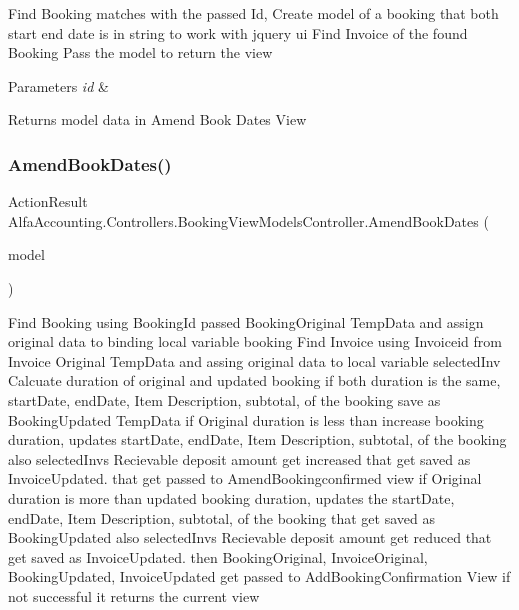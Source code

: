 Find Booking matches with the passed Id, Create model of a booking that both start end date is in string to work with jquery ui Find Invoice of the found Booking Pass the model to return the view 


\begin{DoxyParams}{Parameters}
{\em id} & \\
\hline
\end{DoxyParams}
\begin{DoxyReturn}{Returns}
model data in Amend Book Dates View
\end{DoxyReturn}
\mbox{\label{class_alfa_accounting_1_1_controllers_1_1_booking_view_models_controller_ac7f71cbbf29ebdd1103368248f4f70f8}} 
\subsubsection{\texorpdfstring{Amend\+Book\+Dates()}{AmendBookDates()}\hspace{0.1cm}{\footnotesize\ttfamily [2/2]}}
{\footnotesize\ttfamily Action\+Result Alfa\+Accounting.\+Controllers.\+Booking\+View\+Models\+Controller.\+Amend\+Book\+Dates (\begin{DoxyParamCaption}\item[{\mbox{[}\+Bind(\+Include = \char`\"{}\+Booking\+Id,\+Booked\+Date,\+Booking\+Start\+Date\+Time,\+Booking\+End\+Date\+Time,\+Unit\+Price\+Id,\+Id,\+Invoice\+Id\char`\"{})\mbox{]} Amend\+Book\+Dates\+Date\+Filter\+Model}]{model }\end{DoxyParamCaption})}



Find Booking using Booking\+Id passed Booking\+Original Temp\+Data and assign original data to binding local variable booking Find Invoice using Invoiceid from Invoice Original Temp\+Data and assing original data to local variable selected\+Inv Calcuate duration of original and updated booking if both duration is the same, start\+Date, end\+Date, Item Description, subtotal, of the booking save as Booking\+Updated Temp\+Data if Original duration is less than increase booking duration, updates start\+Date, end\+Date, Item Description, subtotal, of the booking also selected\+Inv\textquotesingle{}s Recievable deposit amount get increased that get saved as Invoice\+Updated. that get passed to Amend\+Bookingconfirmed view if Original duration is more than updated booking duration, updates the start\+Date, end\+Date, Item Description, subtotal, of the booking that get saved as Booking\+Updated also selected\+Inv\textquotesingle{}s Recievable deposit amount get reduced that get saved as Invoice\+Updated. then Booking\+Original, Invoice\+Original, Booking\+Updated, Invoice\+Updated get passed to Add\+Booking\+Confirmation View if not successful it returns the current view 


